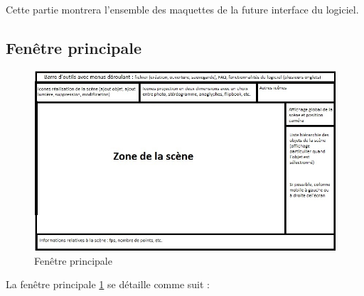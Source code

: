 Cette partie montrera l’ensemble des maquettes de la future interface du logiciel.

\subsection{Fenêtre principale}

\begin{figure}[H]
  \centering
  \includegraphics[scale=0.6]{fenetreprincipale}
  \caption{Fenêtre principale}
  \label{fig:fenppale}
\end{figure}

La fenêtre principale \ref{fig:fenppale} se détaille comme suit :

